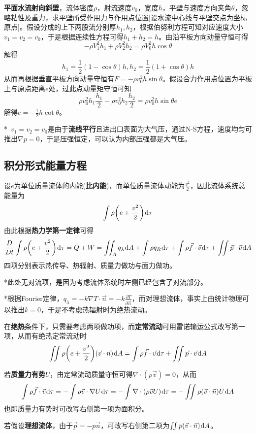 \documentclass[a4paper,UTF8,fontset=windows]{ctexart}
\newcommand*{\dr}{\hspace{0.07em}\mathrm{d}}
\begin{document}
\textbf{平面水流射向斜壁}，流体密度$\rho$，射流速度$v_0$，宽度$h$，平壁与速度方向夹角$\theta$，忽略粘性及重力，求平壁所受作用力与作用点位置[设水流中心线与平壁交点为坐标原点]。假设分成的上下两股流分别厚$h_1,h_2$，根据伯努利方程可知对应速度大小$v_1=v_2=v_0$，于是根据连续性方程可得$h_1+h_2=h$。由沿平板方向动量守恒可得
$$-\rho V_1^2h_1+\rho V_2^2h_2=\rho V_0^2h\cos\theta$$
解得
$$h_1=\frac{1}{2}(1-\cos\theta)h,h_2=\frac{1}{2}(1+\cos\theta)h$$
从而再根据垂直平板方向动量守恒有$F=-\rho v_0^2h\sin\theta$。假设合力作用点位置为平板上与原点距离$e$处，过此点动量矩守恒可知
$$\rho v_0^2h_1\frac{h_1}{2}-\rho v_0^2h_2\frac{h_2}{2}=\rho v_0^2h\sin\theta e$$
解得$e=-\frac{1}{2}h\cot\theta$。

*\ $v_1=v_2=v_0$是由于\textbf{流线平行}且进出口表面为大气压，通过N-S方程，速度均匀可推出$\nabla p=0$，于是压强恒定，可以认为内部压强都是大气压。

\subsection{积分形式能量方程}
设$e$为单位质量流体的内能(\textbf{比内能})，而单位质量流体动能为$\frac{v^2}{2}$，因此流体系统总能量为
$$\int\rho\bigg(e+\frac{v^2}{2}\bigg)\dr\tau$$
由此根据\textbf{热力学第一定律}可得
$$\frac{D}{Dt}\int\rho\bigg(e+\frac{v^2}{2}\bigg)\dr\tau=\dot{Q}+W=\iint_Aq_\lambda\dr A+\int\rho q_R\dr\tau+\int\rho\vec{f}\cdot\vec{v}\dr\tau+\iint\vec{p}\cdot\vec{v}\dr A$$
四项分别表示热传导、热辐射、质量力做功与面力做功。

*此处无对流项，是因为考虑流体系统时左侧已经包含了对流部分。

*根据Fourier定律，$q_\lambda=-k\nabla T\cdot\vec{n}=-k\frac{\partial T}{\partial\vec{n}}$，而对理想流体，事实上由统计物理可以推出$k=0$，于是不考虑热辐射时为绝热流动。

在\textbf{绝热}条件下，只需要考虑两项做功项，而\textbf{定常流动}可用雷诺输运公式改写第一项，从而有绝热定常流动时
$$\iint\rho\bigg(e+\frac{v^2}{2}\bigg)(\vec{v}\cdot\vec{n})\dr A=\int\rho\vec{f}\cdot\vec{v}\dr\tau+\iint\vec{p}\cdot\vec{v}\dr A$$

若\textbf{质量力有势}$U$，由定常流动质量守恒可得$\nabla\cdot(\rho\vec{v})=0$，从而
$$\int\rho\vec{f}\cdot\vec{v}\dr\tau=-\int\rho\vec{v}\cdot\nabla U\dr\tau=-\int\nabla\cdot(\rho\vec{v}U)\dr\tau=-\iint\rho(\vec{v}\cdot\vec{n})U\dr A$$
也即质量力有势时可改写右侧第一项为面积分。

若假设\textbf{理想流体}，由于$\vec{p}=-p\vec{n}$，可改写右侧第二项为$\iint p(\vec{v}\cdot\vec{n})\dr A$。
\end{document}
